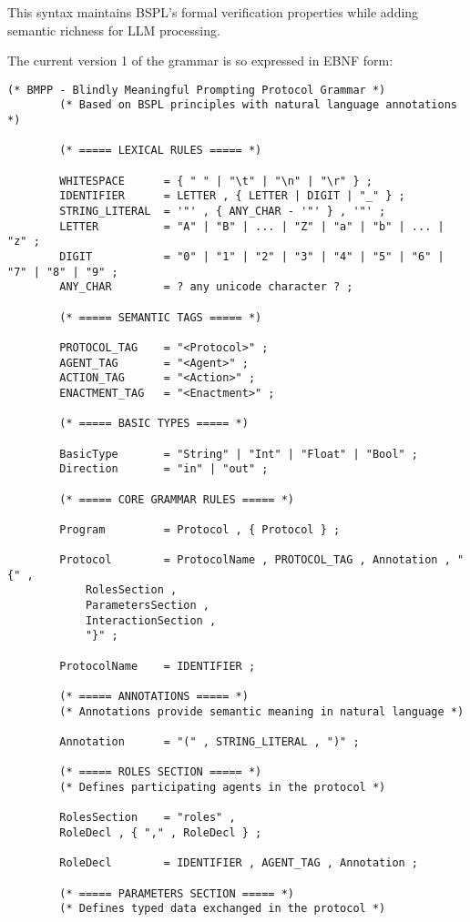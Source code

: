 \documentclass[11pt,a4paper]{article}
\begin{document}
	This syntax maintains BSPL's formal verification properties while adding semantic richness for LLM processing.
	
	The current version 1 of the grammar is so expressed in EBNF form:
	
	\begin{lstlisting}[caption={BMPP Grammar in EBNF Form},label=lst:ebnf-grammar]
		(* BMPP - Blindly Meaningful Prompting Protocol Grammar *)
		(* Based on BSPL principles with natural language annotations *)
		
		(* ===== LEXICAL RULES ===== *)
		
		WHITESPACE      = { " " | "\t" | "\n" | "\r" } ;
		IDENTIFIER      = LETTER , { LETTER | DIGIT | "_" } ;
		STRING_LITERAL  = '"' , { ANY_CHAR - '"' } , '"' ;
		LETTER          = "A" | "B" | ... | "Z" | "a" | "b" | ... | "z" ;
		DIGIT           = "0" | "1" | "2" | "3" | "4" | "5" | "6" | "7" | "8" | "9" ;
		ANY_CHAR        = ? any unicode character ? ;
		
		(* ===== SEMANTIC TAGS ===== *)
		
		PROTOCOL_TAG    = "<Protocol>" ;
		AGENT_TAG       = "<Agent>" ;
		ACTION_TAG      = "<Action>" ;
		ENACTMENT_TAG   = "<Enactment>" ;
		
		(* ===== BASIC TYPES ===== *)
		
		BasicType       = "String" | "Int" | "Float" | "Bool" ;
		Direction       = "in" | "out" ;
		
		(* ===== CORE GRAMMAR RULES ===== *)
		
		Program         = Protocol , { Protocol } ;
		
		Protocol        = ProtocolName , PROTOCOL_TAG , Annotation , "{" ,
			RolesSection ,
			ParametersSection ,
			InteractionSection ,
			"}" ;
		
		ProtocolName    = IDENTIFIER ;
		
		(* ===== ANNOTATIONS ===== *)
		(* Annotations provide semantic meaning in natural language *)
		
		Annotation      = "(" , STRING_LITERAL , ")" ;
		
		(* ===== ROLES SECTION ===== *)
		(* Defines participating agents in the protocol *)
		
		RolesSection    = "roles" ,
		RoleDecl , { "," , RoleDecl } ;
		
		RoleDecl        = IDENTIFIER , AGENT_TAG , Annotation ;
		
		(* ===== PARAMETERS SECTION ===== *)
		(* Defines typed data exchanged in the protocol *)
		

\end{lstlisting}
\end{document}

